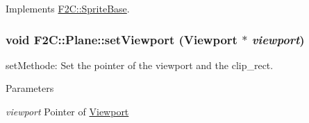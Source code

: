 Implements \hyperlink{class_f2_c_1_1_sprite_base_af9dfc70083ca5a774d3874b61a6f9abc}{F2C::SpriteBase}.\hypertarget{class_f2_c_1_1_plane_a22fe65ae565a11384d5ea1d44d705b1a}{
\subsubsection[{setViewport}]{\setlength{\rightskip}{0pt plus 5cm}void F2C::Plane::setViewport ({\bf Viewport} $\ast$ {\em viewport})}}
\label{class_f2_c_1_1_plane_a22fe65ae565a11384d5ea1d44d705b1a}


setMethode: Set the pointer of the viewport and the clip\_\-rect. 
\begin{DoxyParams}{Parameters}
\item[{\em viewport}]Pointer of \hyperlink{class_f2_c_1_1_viewport}{Viewport} \end{DoxyParams}
